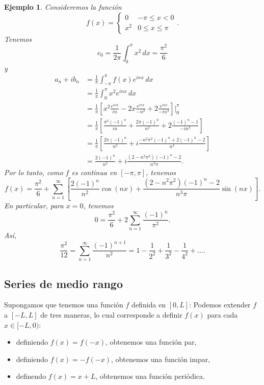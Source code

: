 \documentclass[11pt,letterpaper,draft]{report}
\newtheorem{example}[defn]{Ejemplo}
\newcommand\<{\langle}
\renewcommand\>{\rangle}
\begin{document}
\begin{example}
  Consideremos la función
  \[
    f(x) =
    \begin{cases}
      0 & -\pi\leq x<0 \\
      x^{2} & 0\leq x\leq\pi
    \end{cases}
  .\]
  Tenemos
  \[
    c_0 = \frac{1}{2\pi}\int_{0}^{\pi}x^{2}\,dx = \frac{\pi^{2}}{6}
  \]
  y
  \begin{align*}
    a_n+ib_n
    &= \frac{1}{\pi}\int_{-\pi}^{\pi}f(x)e^{inx}\,dx \\
    &= \frac{1}{\pi}\int_{0}^{\pi}x^{2}e^{inx}\,dx \\
    &= \frac{1}{\pi}
    \left[
      x^{2}\frac{e^{inx}}{in}
      -
      2x\frac{e^{inx}}{-n^{2}}
      +
      2\frac{e^{inx}}{-in^{3}}
    \right]\Big|_{0}^{\pi}
    \\
    &= \frac{1}{\pi}
    \left[
      \frac{\pi^{2}(-1)^{n}}{in}
      +
      \frac{2\pi(-1)^{n}}{n^{2}}
      +
      2\frac{(-1)^{n}-1}{-in^{3}}
    \right]
    \\
    &= \frac{1}{\pi}
    \left[
      \frac{2\pi(-1)^{n}}{n^{2}}
      +
      i\frac{-n^{2}\pi^{2}(-1)^{n}+2(-1)^{n}-2}{n^{3}}
    \right] \\
    &=
      \frac{2(-1)^{n}}{n^{2}}
      +
      i\frac{(2-n^{2}\pi^{2})(-1)^{n}-2}{n^{3}\pi}.
  \end{align*}
  Por lo tanto, como $f$ es continua en $[-\pi,\pi]$, tenemos
  \[
    f(x)
    =
    \frac{\pi^{2}}{6}
    +
    \sum_{n=1}^{\infty} \left[
      \frac{2(-1)^{n}}{n^{2}}\cos(nx)
      +
      \frac{(2-n^{2}\pi^{2})(-1)^{n}-2}{n^{3}\pi}
      \sin(nx)
    \right]
  .\]
  En particular, para $x=0$, tenemos
  \[
    0
    =
    \frac{\pi^{2}}{6}
    +
    2\sum_{n=1}^{\infty}\frac{(-1)^{n}}{\pi^{2}}
  .\]
  Así,
  \[
    \frac{\pi^{2}}{12}
    =
    \sum_{n=1}^{\infty}\frac{(-1)^{n+1}}{n^{2}}
    =
    1-\frac{1}{2^{2}}+\frac{1}{3^{2}}-\frac{1}{4^{2}}+\dots
  .\]
\end{example}

\subsection{Series de medio rango}

Supongamos que tenemos una función $f$ definida en $[0,L]$:
Podemos extender $f$ a $[-L,L]$ de tres maneras, lo cual corresponde a
definir $f(x)$ para cada $x\in[-L,0)$:
\begin{itemize}
  \item definiendo $f(x)=f(-x)$, obtenemos una función par,
  \item definiendo $f(x)=-f(-x)$, obtenemos una función impar,
  \item definendo $f(x)=x+L$, obtenemos una función periódica.
\end{itemize}
\end{document}
